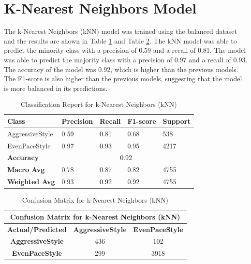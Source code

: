 \section{K-Nearest Neighbors Model}
The k-Nearest Neighbors (kNN) model was trained using the balanced dataset and the results are shown in Table \ref{table:knn_classification_report} and Table \ref{table:knn_confusion_matrix}.
The kNN model was able to predict the minority class with a precision of 0.59 and a recall of 0.81. The model was able to predict the majority class with a precision of 0.97
and a recall of 0.93. The accuracy of the model was 0.92, which is higher than the previous models. The F1-score is also higher than the previous models, suggesting that the model
is more balanced in its predictions.

\begin{table}[H]
    \centering    
    \begin{tabular}{|l|l|l|l|l|}
    \hline
    \textbf{Class} & \textbf{Precision} & \textbf{Recall} & \textbf{F1-score} & \textbf{Support} \\ \hline
    AggressiveStyle & 0.59 & 0.81 & 0.68 & 538 \\ \hline
    EvenPaceStyle & 0.97 & 0.93 & 0.95 & 4217 \\ \hline
    \textbf{Accuracy} & \multicolumn{4}{c|}{0.92} \\ \hline
    \textbf{Macro Avg} & 0.78 & 0.87 & 0.82 & 4755 \\ \hline
    \textbf{Weighted Avg} & 0.93 & 0.92 & 0.92 & 4755 \\ \hline
    \end{tabular}
    \caption{Classification Report for k-Nearest Neighbors (kNN)}
    \label{table:knn_classification_report}
\end{table}


\begin{table}[H]
    \centering
    \begin{tabular}{|c|c|c|}
    \hline
    \multicolumn{3}{|c|}{\textbf{Confusion Matrix for k-Nearest Neighbors (kNN)}} \\
    \hline
    \textbf{Actual/Predicted} & \textbf{AggressiveStyle} & \textbf{EvenPaceStyle} \\ \hline
    \textbf{AggressiveStyle} & 436 & 102 \\ \hline
    \textbf{EvenPaceStyle} & 299 & 3918 \\ \hline
    \end{tabular}
    \caption{Confusion Matrix for k-Nearest Neighbors (kNN)}
    \label{table:knn_confusion_matrix}
\end{table}



